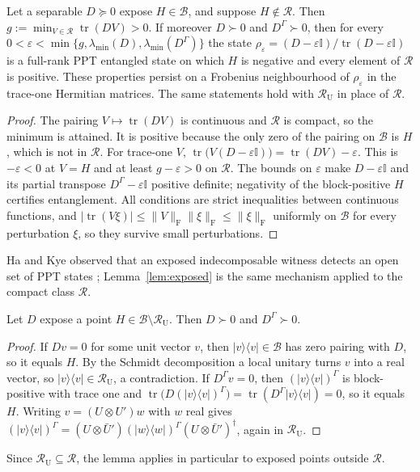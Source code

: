 \documentclass[11pt,a4paper]{article}
\theoremstyle{definition}\newtheorem{definition}[theorem]{Definition}\newtheorem*{conj}{Conjecture 9 of Shen, Chen and Bian}\newtheorem{remark}[theorem]{Remark}
\newcommand{\tr}{\operatorname{tr}}\newcommand{\im}{\operatorname{Im}}\newcommand{\adj}{\operatorname{adj}}\newcommand{\id}{\mathbb I}
\newcommand{\eps}{\varepsilon}\newcommand{\ket}[1]{\lvert #1\rangle}\newcommand{\bra}[1]{\langle #1\rvert}\newcommand{\F}{\mathrm F}\newcommand{\op}{\mathrm{op}}\newcommand{\C}{\mathbb C}
\newcommand{\cB}{\mathcal B}\newcommand{\cR}{\mathcal R}\newcommand{\vecm}{\mathrm{vec}}
\begin{document}
\begin{lemma}\label{lem:exposed}
Let a separable $D\succeq0$ expose $H\in\cB$, and suppose $H\notin\cR$. Then $g:=\min_{V\in\cR}\tr(DV)>0$. If moreover $D\succ0$ and $D^\Gamma\succ0$, then for every $0<\eps<\min\{g,\lambda_{\min}(D),\lambda_{\min}(D^\Gamma)\}$ the state $\rho_\eps=(D-\eps\id)/\tr(D-\eps\id)$ is a full-rank PPT entangled state on which $H$ is negative and every element of $\cR$ is positive. These properties persist on a Frobenius neighbourhood of $\rho_\eps$ in the trace-one Hermitian matrices. The same statements hold with $\cR_{\mathrm U}$ in place of $\cR$.
\end{lemma}
\begin{proof}
The pairing $V\mapsto\tr(DV)$ is continuous and $\cR$ is compact, so the minimum is attained. It is positive because the only zero of the pairing on $\cB$ is $H$, which is not in $\cR$. For trace-one $V$, $\tr\bigl(V(D-\eps\id)\bigr)=\tr(DV)-\eps$. This is $-\eps<0$ at $V=H$ and at least $g-\eps>0$ on $\cR$. The bounds on $\eps$ make $D-\eps\id$ and its partial transpose $D^\Gamma-\eps\id$ positive definite; negativity of the block-positive $H$ certifies entanglement. All conditions are strict inequalities between continuous functions, and $|\tr(V\xi)|\leq\|V\|_\F\|\xi\|_\F\leq\|\xi\|_\F$ uniformly on $\cB$ for every perturbation $\xi$, so they survive small perturbations.
\end{proof}
Ha and Kye observed that an exposed indecomposable witness detects an open set of PPT states \cite[Introduction]{hakye}; Lemma~\ref{lem:exposed} is the same mechanism applied to the compact class $\cR$.

\begin{lemma}\label{lem:fullrank}
Let $D$ expose a point $H\in\cB\setminus\cR_{\mathrm U}$. Then $D\succ0$ and $D^\Gamma\succ0$.
\end{lemma}
\begin{proof}
If $Dv=0$ for some unit vector $v$, then $\ket v\bra v\in\cB$ has zero pairing with $D$, so it equals $H$. By the Schmidt decomposition a local unitary turns $v$ into a real vector, so $\ket v\bra v\in\cR_{\mathrm U}$, a contradiction. If $D^\Gamma v=0$, then $(\ket v\bra v)^\Gamma$ is block-positive with trace one and $\tr\bigl(D(\ket v\bra v)^\Gamma\bigr)=\tr(D^\Gamma\ket v\bra v)=0$, so it equals $H$. Writing $v=(U\otimes U')w$ with $w$ real gives $(\ket v\bra v)^\Gamma=(U\otimes\bar U')(\ket w\bra w)^\Gamma(U\otimes\bar U')^\dagger$, again in $\cR_{\mathrm U}$.
\end{proof}
Since $\cR_{\mathrm U}\subseteq\cR$, the lemma applies in particular to exposed points outside $\cR$.
\end{document}
